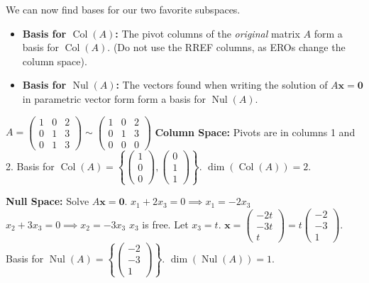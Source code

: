 \documentclass[oneside]{book}
\begin{document}
We can now find bases for our two favorite subspaces.
\begin{itemize}
    \item \textbf{Basis for $\operatorname{Col}(A)$:}
    The pivot columns of the \emph{original} matrix $A$ form a basis for $\operatorname{Col}(A)$.
    (Do not use the RREF columns, as EROs change the column space).
    
    \item \textbf{Basis for $\operatorname{Nul}(A)$:}
    The vectors found when writing the solution of $A\mathbf{x} = \mathbf{0}$ in parametric vector form form a basis for $\operatorname{Nul}(A)$.
\end{itemize}

\begin{example}
$A = \begin{pmatrix} 1 & 0 & 2 \\ 0 & 1 & 3 \\ 0 & 1 & 3 \end{pmatrix} \sim \begin{pmatrix} 1 & 0 & 2 \\ 0 & 1 & 3 \\ 0 & 0 & 0 \end{pmatrix}$
\textbf{Column Space:} Pivots are in columns 1 and 2.
Basis for $\operatorname{Col}(A) = \left\{ \begin{pmatrix} 1 \\ 0 \\ 0 \end{pmatrix}, \begin{pmatrix} 0 \\ 1 \\ 1 \end{pmatrix} \right\}$.
$\dim(\operatorname{Col}(A)) = 2$.

\textbf{Null Space:} Solve $A\mathbf{x} = \mathbf{0}$.
$x_1 + 2x_3 = 0 \implies x_1 = -2x_3$
$x_2 + 3x_3 = 0 \implies x_2 = -3x_3$
$x_3$ is free. Let $x_3 = t$.
$\mathbf{x} = \begin{pmatrix} -2t \\ -3t \\ t \end{pmatrix} = t \begin{pmatrix} -2 \\ -3 \\ 1 \end{pmatrix}$.
Basis for $\operatorname{Nul}(A) = \left\{ \begin{pmatrix} -2 \\ -3 \\ 1 \end{pmatrix} \right\}$.
$\dim(\operatorname{Nul}(A)) = 1$.
\end{example}
\end{document}
